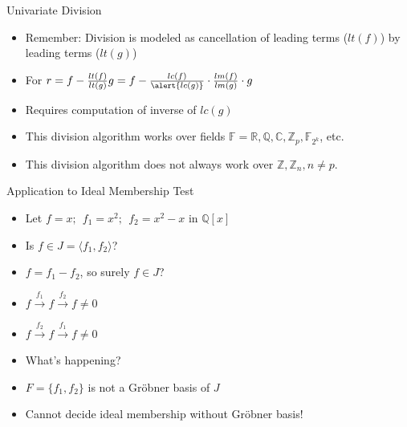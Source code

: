 \documentclass[xcolor=dvipsnames]{beamer}
\newcommand{\Z}{{\mathbb{Z}}}
\newcommand{\R}{{\mathbb{R}}}
\newcommand{\Q}{{\mathbb{Q}}}
\newcommand{\C}{{\mathbb{C}}}
\newcommand{\Zn}{{\mathbb{Z}}_{n}}
\newcommand{\F}{{\mathbb{F}}}
\newcommand{\Fkk}{{\mathbb{F}}_{2^k}}
\newcommand{\bi}{\begin{itemize}}
\newcommand{\ei}{\end{itemize}}
\begin{document}
\begin{frame}{{\large Univariate Division }}
\bi
\item Remember: Division is modeled as cancellation of leading terms
  ($lt(f)$) by leading terms ($lt(g)$)
\item For $r = f - \frac{lt(f)}{lt(g)} g = f -
  \frac{lc(f)}{\alert{lc(g)}}\cdot\frac{lm(f)}{lm(g)}\cdot g$
\item Requires computation of inverse of $lc(g)$
\item This division algorithm works over fields $\F = \R, \Q, \C,
  \Z_p, \Fkk$, etc.
\item This division algorithm does not always work over $\Z, \Zn,
  n\neq p$. 
\ei
\end{frame}


\begin{frame}{{\large Application to Ideal Membership Test}}

\bi [<+->]
\item Let $f = x; ~~f_1 = x^2; ~~f_2 = x^2 - x$ in $\Q[x]$
\item Is $f \in J = \langle f_1, f_2 \rangle$?
\item $f = f_1 - f_2$, so surely $f \in J$?
\item $f \xrightarrow{f_1} f \xrightarrow{f_2} f \neq 0$
\item $f \xrightarrow{f_2} f \xrightarrow{f_1} f \neq 0$
\item What's happening?
\item $F = \{f_1, f_2\}$ is not a Gr\"obner basis of $J$
\item Cannot decide ideal membership without Gr\"obner basis!
\ei

\end{frame}
\end{document}
